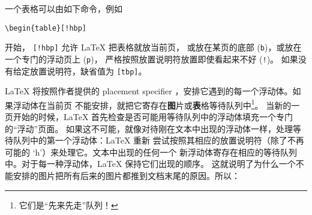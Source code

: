 一个表格可以由如下命令，例如
\begin{code}
\verb|\begin{table}[!hbp]|
\end{code}
\noindent 开始， \verb|[!hbp]| 允许 \LaTeX{} 把表格就放当前页，
或放在某页的底部 (\texttt{b})，或放在一个专门的浮动页上 (\texttt{p})，
严格按照放置说明符放置即使看起来不好 (\texttt{!})。
如果没有给定放置说明符，缺省值为 \verb|[tbp]|。

\LaTeX{} 将按照作者提供的 placement
specifier ，安排它遇到的每一个浮动体。如果浮动体在当前页
不能安排，就把它寄存在{\textbf 图片}或{\textbf
表格}等待队列中\footnote{它们是“先来先走”队列！}。
当新的一页开始的时候，\LaTeX{} 首先检查是否可能用等待队列中的浮动体填充一个专门的“浮动”页面。
如果这不可能，就像对待刚在文本中出现的浮动体一样，处理等待队列中的第一个浮动体：\LaTeX{} 重新
尝试按照其相应的放置说明符（除了不再可能的 `h'）来处理它。文本中出现的任何一个
新浮动体寄存在相应的等待队列中。对于每一种浮动体，\LaTeX{} 保持它们出现的顺序。
这就说明了为什么一个不能安排的图片把所有后来的图片都推到文档末尾的原因。所以：

